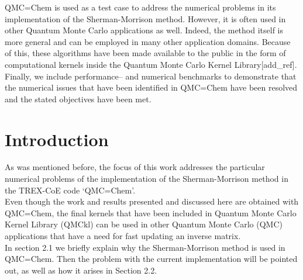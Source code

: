\documentclass[11pt]{article}
\numberwithin{figure}{section}
\numberwithin{table}{section}
\begin{document}
      QMC=Chem is used as a test case to address the numerical problems in its implementation of the Sherman-Morrison method. However, it is often used in other Quantum Monte Carlo applications as well. Indeed, the method itself is more general and can be employed in many other application domains. Because of this, these algorithms have been made available to the public in the form of computational kernels inside the Quantum Monte Carlo Kernel Library[add\_ref].\\
      
      Finally, we include performance-- and numerical benchmarks to demonstrate that the numerical issues that have been identified in QMC=Chem have been resolved and the stated objectives have been met.

  \section{Introduction}
	
      As was mentioned before, the focus of this work addresses the particular numerical problems of the implementation of the Sherman-Morrison method in the TREX-CoE code `QMC=Chem'.\\
      
      Even though the work and results presented and discussed here are obtained with QMC=Chem, the final kernels that have been included in Quantum Monte Carlo Kernel Library (QMCkl) can be used in other Quantum Monte Carlo (QMC) applications that have a need for fast updating an inverse matrix.\\
      
        In section 2.1 we briefly explain why the Sherman-Morrison method is used in QMC=Chem. Then the problem with the current implementation will be pointed out, as well as how it arises in Section 2.2.
	
\end{document}
